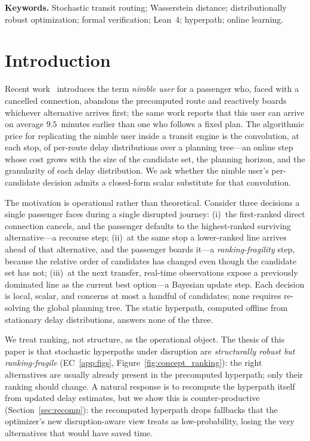 \documentclass[11pt]{article}
\theoremstyle{definition}
\theoremstyle{remark}
\begin{document}
\noindent\textbf{Keywords.} Stochastic transit routing; Wasserstein distance; distributionally robust optimization; formal verification; Lean~4; hyperpath; online learning.

\section{Introduction}
\label{sec:intro}

Recent work~\cite{durner2024} introduces the term \emph{nimble user} for a passenger who, faced with a cancelled connection, abandons the precomputed route and reactively boards whichever alternative arrives first; the same work reports that this user can arrive on average $9.5$~minutes earlier than one who follows a fixed plan. The algorithmic price for replicating the nimble user inside a transit engine is the convolution, at each stop, of per-route delay distributions over a planning tree---an online step whose cost grows with the size of the candidate set, the planning horizon, and the granularity of each delay distribution. We ask whether the nimble user's per-candidate decision admits a closed-form scalar substitute for that convolution.

The motivation is operational rather than theoretical. Consider three decisions a single passenger faces during a single disrupted journey: (i)~the first-ranked direct connection cancels, and the passenger defaults to the highest-ranked surviving alternative---a recourse step; (ii)~at the same stop a lower-ranked line arrives ahead of that alternative, and the passenger boards it---a \emph{ranking-fragility} step, because the relative order of candidates has changed even though the candidate set has not; (iii)~at the next transfer, real-time observations expose a previously dominated line as the current best option---a Bayesian update step. Each decision is local, scalar, and concerns at most a handful of candidates; none requires re-solving the global planning tree. The static hyperpath, computed offline from stationary delay distributions, answers none of the three.

We treat ranking, not structure, as the operational object. The thesis of this paper is that stochastic hyperpaths under disruption are \emph{structurally robust but ranking-fragile} (EC~\ref{app:figs}, Figure~\ref{fig:concept_ranking}): the right alternatives are usually already present in the precomputed hyperpath; only their ranking should change. A natural response is to recompute the hyperpath itself from updated delay estimates, but we show this is counter-productive (Section~\ref{sec:recomp}): the recomputed hyperpath drops fallbacks that the optimizer's new disruption-aware view treats as low-probability, losing the very alternatives that would have saved time.
\end{document}
